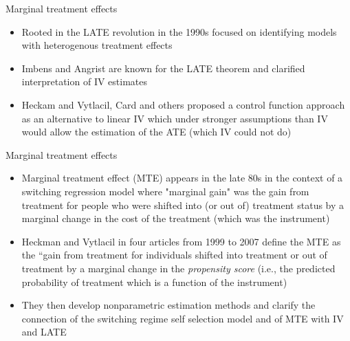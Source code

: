 \documentclass{beamer}
\begin{document}
\begin{frame}{Marginal treatment effects}

\begin{itemize}

\item Rooted in the LATE revolution in the 1990s focused on identifying models with heterogenous treatment effects
\item Imbens and Angrist are known for the LATE theorem and clarified interpretation of IV estimates
\item Heckam and Vytlacil, Card and others proposed a control function approach as an alternative to linear IV which under stronger assumptions than IV would allow the estimation of the ATE (which IV could not do)
\end{itemize}

\end{frame}

\begin{frame}{Marginal treatment effects}

\begin{itemize}
\item Marginal treatment effect (MTE) appears in the late 80s in the context of a switching regression model where "marginal gain" was the gain from treatment for people who were shifted into (or out of) treatment status by a marginal change in the cost of the treatment (which was the instrument)

\item Heckman and Vytlacil in four articles from 1999 to 2007 define the MTE as the ``gain from treatment for individuals shifted into treatment or out of treatment by a marginal change in the \emph{propensity score} (i.e., the predicted probability of treatment which is a function of the instrument)
\item They then develop nonparametric estimation methods and clarify the connection of the switching regime self selection model and of MTE with IV and LATE

\end{itemize}

\end{frame}
\end{document}
